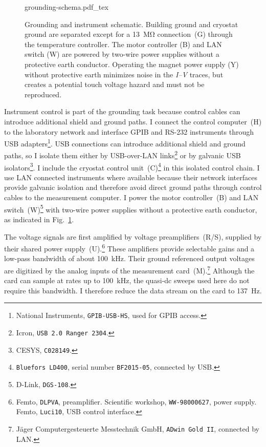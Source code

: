         \begin{figure}[t!]
            \centering
            {\fontsize{6}{9}\selectfont
            {grounding-schema.pdf_tex}
            }
            \vspace{-.5em}
            \caption{
                Grounding and instrument schematic. Building ground and cryostat ground are separated except for a \qty{13}{\mega\ohm} connection~(G) through the temperature controller. The motor controller (B) and LAN switch (W) are powered by two-wire power supplies without a protective earth conductor. Operating the magnet power supply (Y) without protective earth minimizes noise in the \textit{I--V} traces, but creates a potential touch voltage hazard and must not be reproduced.
                }
            \label{fig:setup:grounding}
        \end{figure}

        Instrument control is part of the grounding task because control cables can introduce additional shield and ground paths. I connect the control computer~(H) to the laboratory network and interface GPIB and RS-232 instruments through USB adapters\footnote{National Instruments, \texttt{GPIB-USB-HS}, used for GPIB access.}. USB connections can introduce additional shield and ground paths, so I isolate them either by USB-over-LAN links\footnote{Icron, \texttt{USB 2.0 Ranger 2304}.} or by galvanic USB isolators\footnote{CESYS, \texttt{C028149}.}. I include the cryostat control unit~(C)\footnote{\texttt{Bluefors LD400}, serial number \texttt{BF2015-05}, connected by USB.} in this isolated control chain. I use LAN connected instruments where available because their network interfaces provide galvanic isolation and therefore avoid direct ground paths through control cables to the measurement computer. I power the motor controller~(B) and LAN switch~(W)\footnote{D-Link, \texttt{DGS-108}.} with two-wire power supplies without a protective earth conductor, as indicated in Fig.~\ref{fig:setup:grounding}.

        The voltage signals are first amplified by voltage preamplifiers~(R/S), supplied by their shared power supply~(U).\footnote{Femto, \texttt{DLPVA}, preamplifier. Scientific workshop, \texttt{WW-98000627}, power supply. Femto, \texttt{Luci10}, USB control interface.} These amplifiers provide selectable gains and a low-pass bandwidth of about \qty{100}{\kilo\hertz}. Their ground referenced output voltages are digitized by the analog inputs of the measurement card~(M).\footnote{Jäger Computergesteuerte Messtechnik GmbH, \texttt{ADwin Gold II}, connected by LAN.} Although the card can sample at rates up to \qty{100}{\kilo\hertz}, the quasi-dc sweeps used here do not require this bandwidth. I therefore reduce the data stream on the card to \qty{137}{\hertz}.


